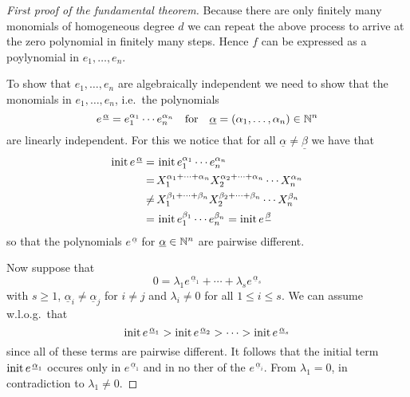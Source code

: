 \begin{proof}[First proof of the fundamental theorem]
  Because there are only finitely many monomials of homogeneous degree $d$ we can repeat the above process to arrive at the zero polynomial in finitely many steps.
  Hence $f$ can be expressed as a poylynomial in $e_1, \dotsc, e_n$.
  
  To show that $e_1, \dotsc, e_n$ are algebraically independent we need to show that the monomials in $e_1, \dotsc, e_n$, i.e.\ the polynomials
  \[
      e^{\,\underline{\alpha}}
    = e_1^{\alpha_1} \dotsm e_n^{\alpha_n}
    \quad\text{for}\quad
        \underline{\alpha}
    =   (\alpha_1, \dotsc, \alpha_n)
    \in \mathbb{N}^n
  \]
  are linearly independent.
  For this we notice that for all $\underline{\alpha} \neq \underline{\beta}$ we have that
  \begin{align*}
            \operatorname{init} e^{\,\underline{\alpha}}
       =&\, \operatorname{init} e_1^{\alpha_1} \dotsm e_n^{\alpha_n}   \\
       =&\, X_1^{\alpha_1 + \dotsb + \alpha_n} X_2^{\alpha_2 + \dotsb + \alpha_n} \dotsm X_n^{\alpha_n} \\
    \neq&\, X_1^{\beta_1 + \dotsb + \beta_n}   X_2^{\beta_2  + \dotsb + \beta_n}  \dotsm X_n^{\beta_n}  \\
       =&\, \operatorname{init} e_1^{\beta_1} \dotsm e_n^{\beta_n}
       =    \operatorname{init} e^{\,\underline{\beta}}
  \end{align*}
  so that the polynomials $e^{\,\underline{\alpha}}$ for $\underline{\alpha} \in \mathbb{N}^n$ are pairwise different.
  
  Now suppose that
  \[
      0
    = \lambda_1 e^{\,\underline{\alpha}_1} + \dotsb + \lambda_s e^{\,\underline{\alpha}_s}
  \]
  with $s \geq 1$, $\underline{\alpha}_i \neq \underline{\alpha}_j$ for $i \neq j$ and $\lambda_i \neq 0$ for all $1 \leq i \leq s$.
  We can assume w.l.o.g.\ that 
  \[
      \operatorname{init} e^{\,\underline{\alpha}_1}
    > \operatorname{init} e^{\,\underline{\alpha}_2}
    > \dotsb
    > \operatorname{init} e^{\,\underline{\alpha}_s}
  \]
  since all of these terms are pairwise different.
  It follows that the initial term $\operatorname{init} e^{\,\underline{\alpha}_1}$ occures only in $e^{\,\underline{\alpha}_1}$ and in no ther of the $e^{\,\underline{\alpha}_i}$.
  From $\lambda_1 = 0$, in contradiction to $\lambda_1 \neq 0$.
\end{proof}


